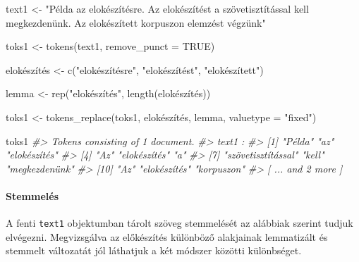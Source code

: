\documentclass[
]{book}
\newenvironment{Shaded}{\begin{snugshade}}{\end{snugshade}}
\newcommand{\AttributeTok}[1]{\textcolor[rgb]{0.77,0.63,0.00}{#1}}
\newcommand{\CommentTok}[1]{\textcolor[rgb]{0.56,0.35,0.01}{\textit{#1}}}
\newcommand{\ConstantTok}[1]{\textcolor[rgb]{0.00,0.00,0.00}{#1}}
\newcommand{\FunctionTok}[1]{\textcolor[rgb]{0.00,0.00,0.00}{#1}}
\newcommand{\NormalTok}[1]{#1}
\newcommand{\OtherTok}[1]{\textcolor[rgb]{0.56,0.35,0.01}{#1}}
\newcommand{\StringTok}[1]{\textcolor[rgb]{0.31,0.60,0.02}{#1}}
\begin{document}
\begin{Shaded}
\begin{Highlighting}[]

\NormalTok{text1 }\OtherTok{\textless{}{-}} \StringTok{"Példa az elokészítésre. Az elokészítést a szövetisztítással kell megkezdenünk. Az elokészített korpuszon elemzést végzünk"}

\NormalTok{toks1 }\OtherTok{\textless{}{-}} \FunctionTok{tokens}\NormalTok{(text1, }\AttributeTok{remove\_punct =} \ConstantTok{TRUE}\NormalTok{)}

\NormalTok{elokészítés }\OtherTok{\textless{}{-}} \FunctionTok{c}\NormalTok{(}\StringTok{"elokészítésre"}\NormalTok{, }\StringTok{"elokészítést"}\NormalTok{, }\StringTok{"elokészített"}\NormalTok{)}

\NormalTok{lemma }\OtherTok{\textless{}{-}} \FunctionTok{rep}\NormalTok{(}\StringTok{"elokészítés"}\NormalTok{, }\FunctionTok{length}\NormalTok{(elokészítés))}

\NormalTok{toks1 }\OtherTok{\textless{}{-}} \FunctionTok{tokens\_replace}\NormalTok{(toks1, elokészítés, lemma, }\AttributeTok{valuetype =} \StringTok{"fixed"}\NormalTok{)}

\NormalTok{toks1}
\CommentTok{\#\textgreater{} Tokens consisting of 1 document.}
\CommentTok{\#\textgreater{} text1 :}
\CommentTok{\#\textgreater{}  [1] "Példa"             "az"                "elokészítés"      }
\CommentTok{\#\textgreater{}  [4] "Az"                "elokészítés"       "a"                }
\CommentTok{\#\textgreater{}  [7] "szövetisztítással" "kell"              "megkezdenünk"     }
\CommentTok{\#\textgreater{} [10] "Az"                "elokészítés"       "korpuszon"        }
\CommentTok{\#\textgreater{} [ ... and 2 more ]}
\end{Highlighting}
\end{Shaded}

\hypertarget{stemmeluxe9s}{%
\paragraph{Stemmelés}\label{stemmeluxe9s}}

A fenti \texttt{text1} objektumban tárolt szöveg stemmelését az alábbiak
szerint tudjuk elvégezni. Megvizsgálva az előkészítés különböző
alakjainak lemmatizált és stemmelt változatát jól láthatjuk a két
módszer közötti különbséget.
\end{document}
